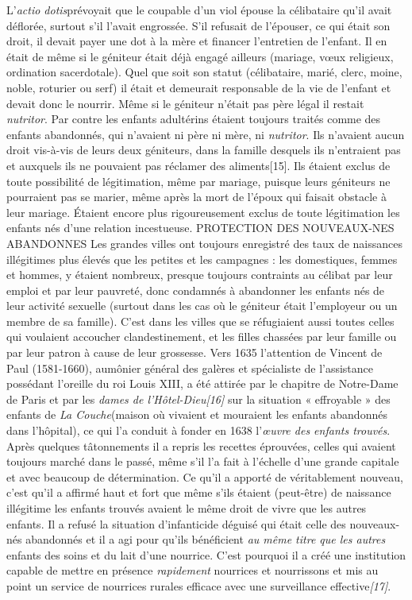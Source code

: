  L'\emph{actio dotis}prévoyait que le coupable d'un viol épouse la célibataire qu'il avait déflorée, surtout s'il l'avait engrossée. S'il refusait de l'épouser, ce qui était son droit, il devait payer une dot à la mère et financer l'entretien de l'enfant. Il en était de même si le géniteur était déjà engagé ailleurs (mariage, vœux religieux, ordination sacerdotale). Quel que soit son statut (célibataire, marié, clerc, moine, noble, roturier ou serf) il était et demeurait responsable de la vie de l'enfant et devait donc le nourrir. Même si le géniteur n'était pas père légal il restait \emph{nutritor}.
 Par contre les enfants adultérins étaient toujours traités comme des enfants abandonnés, qui n'avaient ni père ni mère, ni \emph{nutritor}. Ils n'avaient aucun droit vis-à-vis de leurs deux géniteurs, dans la famille desquels ils n'entraient pas et auxquels ils ne pouvaient pas réclamer des aliments[15]. Ils étaient exclus de toute possibilité de légitimation, même par mariage, puisque leurs géniteurs ne pourraient pas se marier, même après la mort de l'époux qui faisait obstacle à leur mariage. 
 Étaient encore plus rigoureusement exclus de toute légitimation les enfants nés d'une relation incestueuse.
PROTECTION DES NOUVEAUX-NES ABANDONNES
 Les grandes villes ont toujours enregistré des taux de naissances illégitimes plus élevés que les petites et les campagnes : les domestiques, femmes et hommes, y étaient nombreux, presque toujours contraints au célibat par leur emploi et par leur pauvreté, donc condamnés à abandonner les enfants nés de leur activité sexuelle (surtout dans les cas où le géniteur était l'employeur ou un membre de sa famille). C'est dans les villes que se réfugiaient aussi toutes celles qui voulaient accoucher clandestinement, et les filles chassées par leur famille ou par leur patron à cause de leur grossesse.
 Vers 1635 l'attention de Vincent de Paul (1581-1660), aumônier général des galères et spécialiste de l'assistance possédant l'oreille du roi Louis XIII, a été attirée par le chapitre de Notre-Dame de Paris et par les \emph{dames de l'Hôtel-Dieu[16]} sur la situation « effroyable » des enfants de \emph{La Couche}(maison où vivaient et mouraient les enfants abandonnés dans l'hôpital), ce qui l'a conduit à fonder en 1638 l'\emph{œuvre des enfants trouvés}. Après quelques tâtonnements il a repris les recettes éprouvées, celles qui avaient toujours marché dans le passé, même s'il l'a fait à l'échelle d'une grande capitale et avec beaucoup de détermination. Ce qu'il a apporté de véritablement nouveau, c'est qu'il a affirmé haut et fort que même s'ils étaient (peut-être) de naissance illégitime les enfants trouvés avaient le même droit de vivre que les autres enfants. Il a refusé la situation d'infanticide déguisé qui était celle des nouveaux-nés abandonnés et il a agi pour qu'ils bénéficient \emph{au même titre que les autres} enfants des soins et du lait d'une nourrice. C'est pourquoi il a créé une institution capable de mettre en présence \emph{rapidement} nourrices et nourrissons et mis au point un service de nourrices rurales efficace avec une surveillance effective\emph{[17]}.
